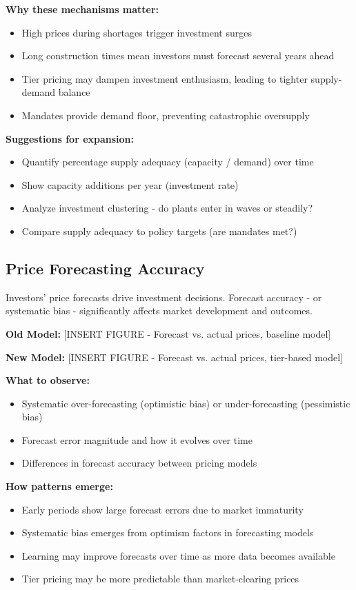\documentclass[10.5pt]{article}
\begin{document}
\textbf{Why these mechanisms matter:}
\begin{itemize}
    \item High prices during shortages trigger investment surges
    \item Long construction times mean investors must forecast several years ahead
    \item Tier pricing may dampen investment enthusiasm, leading to tighter supply-demand balance
    \item Mandates provide demand floor, preventing catastrophic oversupply
\end{itemize}

\textbf{Suggestions for expansion:}
\begin{itemize}
    \item Quantify percentage supply adequacy (capacity / demand) over time
    \item Show capacity additions per year (investment rate)
    \item Analyze investment clustering - do plants enter in waves or steadily?
    \item Compare supply adequacy to policy targets (are mandates met?)
\end{itemize}

\subsection{Price Forecasting Accuracy}

Investors' price forecasts drive investment decisions. Forecast accuracy - or systematic bias - significantly affects market development and outcomes.

\textbf{Old Model:} [INSERT FIGURE - Forecast vs. actual prices, baseline model]

\textbf{New Model:} [INSERT FIGURE - Forecast vs. actual prices, tier-based model]

\textbf{What to observe:}
\begin{itemize}
    \item Systematic over-forecasting (optimistic bias) or under-forecasting (pessimistic bias)
    \item Forecast error magnitude and how it evolves over time
    \item Differences in forecast accuracy between pricing models
\end{itemize}

\textbf{How patterns emerge:}
\begin{itemize}
    \item Early periods show large forecast errors due to market immaturity
    \item Systematic bias emerges from optimism factors in forecasting models
    \item Learning may improve forecasts over time as more data becomes available
    \item Tier pricing may be more predictable than market-clearing prices
\end{itemize}
\end{document}
